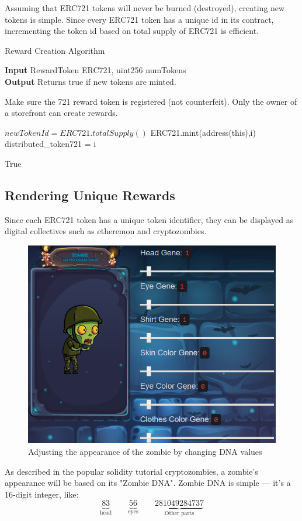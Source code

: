\documentclass[12pt,tightenlines,letterpaper]{scrartcl}
\begin{document}
 
   Assuming that ERC721 tokens will never be burned (destroyed), creating new tokens is simple. Since every ERC721 token has a unique id in its contract, incrementing the token id based on total supply of ERC721 is efficient.
  \begin{algorithm}[ht]
    \caption{Reward Creation Algorithm}\label{alg:algorithm2}
    \hspace*{\algorithmicindent} \textbf{Input}  RewardToken ERC721, uint256 numTokens \\
    \hspace*{\algorithmicindent} \textbf{Output} Returns true if new tokens are minted.
    
    \begin{algorithmic}[1]
      \Require
        \Statex Make sure the 721 reward token is registered (not counterfeit).
        \Statex Only the owner of a storefront can create rewards.

      \State $newTokenId=ERC721.totalSupply()$
      \Repeat
      	 \State ERC721.mint(address(this),i) 
           \State distributed\_token721 = i
           
      \Return True
    \end{algorithmic}
  \end{algorithm}

\subsection{Rendering Unique Rewards}

Since each ERC721 token has a unique token identifier, they can be displayed as digital collectives such as etheremon and cryptozombies.


\begin{figure}[H]
\centering
\includegraphics[width=0.7\linewidth]{cryptozombies}
\caption{Adjusting the appearance of the zombie by changing DNA values}
\label{fig:cryptozombies}
\end{figure}
As described in the popular solidity tutorial cryptozombies, a zombie's appearance will be based on its "Zombie DNA". Zombie DNA is simple — it's a 16-digit integer, like:
\[
\underbrace{83}_{\text{head}} \qquad  \underbrace{56}_{\text{eyes}} \qquad \underbrace{281049284737}_{\text{Other parts}}
\]
\end{document}
